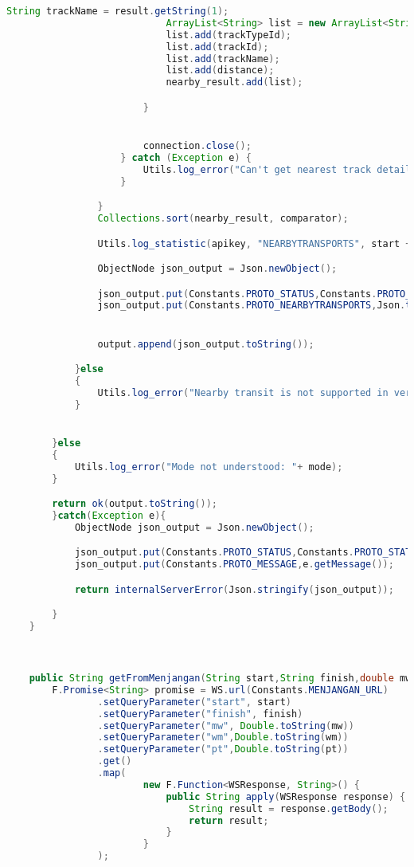 \begin{lstlisting}[language=Java,basicstyle=\tiny,caption=Application.java]
                            String trackName = result.getString(1);
                            ArrayList<String> list = new ArrayList<String>();
                            list.add(trackTypeId);
                            list.add(trackId);
                            list.add(trackName);
                            list.add(distance);
                            nearby_result.add(list);

                        }


                        connection.close();
                    } catch (Exception e) {
                        Utils.log_error("Can't get nearest track details:  " + e.getMessage());
                    }

                }
                Collections.sort(nearby_result, comparator);

                Utils.log_statistic(apikey, "NEARBYTRANSPORTS", start + results.size());

                ObjectNode json_output = Json.newObject();

                json_output.put(Constants.PROTO_STATUS,Constants.PROTO_STATUS_OK);
                json_output.put(Constants.PROTO_NEARBYTRANSPORTS,Json.toJson(nearby_result));


                output.append(json_output.toString());

            }else
            {
                Utils.log_error("Nearby transit is not supported in version 1");
            }


        }else
        {
            Utils.log_error("Mode not understood: "+ mode);
        }

        return ok(output.toString());
        }catch(Exception e){
            ObjectNode json_output = Json.newObject();

            json_output.put(Constants.PROTO_STATUS,Constants.PROTO_STATUS_ERROR);
            json_output.put(Constants.PROTO_MESSAGE,e.getMessage());

            return internalServerError(Json.stringify(json_output));

        }
    }



    public String getFromMenjangan(String start,String finish,double mw,double wm,double pt){
        F.Promise<String> promise = WS.url(Constants.MENJANGAN_URL)
                .setQueryParameter("start", start)
                .setQueryParameter("finish", finish)
                .setQueryParameter("mw", Double.toString(mw))
                .setQueryParameter("wm",Double.toString(wm))
                .setQueryParameter("pt",Double.toString(pt))
                .get()
                .map(
                        new F.Function<WSResponse, String>() {
                            public String apply(WSResponse response) {
                                String result = response.getBody();
                                return result;
                            }
                        }
                );



\end{lstlisting}

